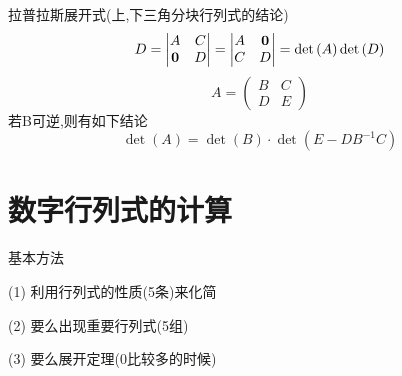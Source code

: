 \documentclass[12pt, a4paper, oneside, UTF8]{ctexbook}
\begin{document}
拉普拉斯展开式(上,下三角分块行列式的结论)
$$
D = 
\begin{vmatrix}
A & C \\
\mathbf{0}& D  
\end{vmatrix} 
= \begin{vmatrix}
A & \mathbf{0} \\
C & D
\end{vmatrix}
= \det{(A)}\det{(D)} \\
$$
$$
A = \begin{pmatrix}
B & C \\
D & E
\end{pmatrix} 
$$
若B可逆,则有如下结论
$$
\det(A) = \det(B) \cdot \det(E - D B^{-1} C)
$$

\newpage

\section{数字行列式的计算}
\begin{remark}
    基本方法
    \item [(1)]利用行列式的性质(5条)来化简
    \item [(2)] 要么出现重要行列式(5组) 
    \item [(3)] 要么展开定理(0比较多的时候)
\end{remark}
\end{document}
